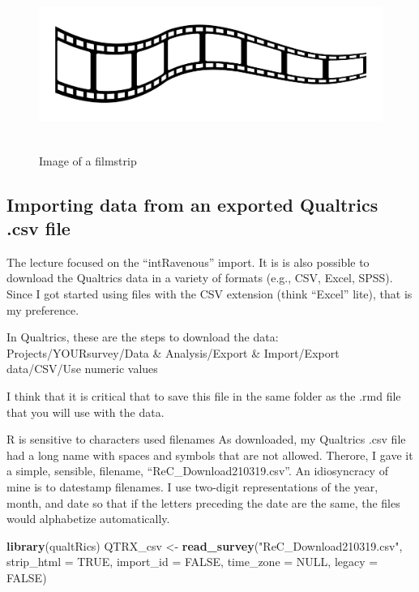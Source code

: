 \documentclass[
  11pt,
]{book}
\newenvironment{Shaded}{\begin{snugshade}}{\end{snugshade}}
\newcommand{\AttributeTok}[1]{\textcolor[rgb]{0.27,0.27,0.27}{#1}}
\newcommand{\ConstantTok}[1]{\textcolor[rgb]{0.37,0.37,0.37}{#1}}
\newcommand{\FunctionTok}[1]{\textcolor[rgb]{0.27,0.27,0.27}{\textbf{#1}}}
\newcommand{\NormalTok}[1]{#1}
\newcommand{\OtherTok}[1]{\textcolor[rgb]{0.37,0.37,0.37}{#1}}
\newcommand{\StringTok}[1]{\textcolor[rgb]{0.5,0.5,0.5}{#1}}
\begin{document}
\begin{figure}
\hypertarget{id}{%
\centering
\includegraphics[width=6.45833in,height=2.19792in]{images/film-strip-1.jpg}
\caption{Image of a filmstrip}\label{id}
}
\end{figure}

\hypertarget{importing-data-from-an-exported-qualtrics-.csv-file}{%
\subsection{Importing data from an exported Qualtrics .csv file}\label{importing-data-from-an-exported-qualtrics-.csv-file}}

The lecture focused on the ``intRavenous'' import. It is is also possible to download the Qualtrics data in a variety of formats (e.g., CSV, Excel, SPSS). Since I got started using files with the CSV extension (think ``Excel'' lite), that is my preference.

In Qualtrics, these are the steps to download the data: Projects/YOURsurvey/Data \& Analysis/Export \& Import/Export data/CSV/Use numeric values

I think that it is critical that to save this file in the same folder as the .rmd file that you will use with the data.

R is sensitive to characters used filenames As downloaded, my Qualtrics .csv file had a long name with spaces and symbols that are not allowed. Therore, I gave it a simple, sensible, filename, ``ReC\_Download210319.csv''. An idiosyncracy of mine is to datestamp filenames. I use two-digit representations of the year, month, and date so that if the letters preceding the date are the same, the files would alphabetize automatically.

\begin{Shaded}
\begin{Highlighting}[]
\FunctionTok{library}\NormalTok{(qualtRics)}
\NormalTok{QTRX\_csv }\OtherTok{\textless{}{-}} \FunctionTok{read\_survey}\NormalTok{(}\StringTok{"ReC\_Download210319.csv"}\NormalTok{, }\AttributeTok{strip\_html =} \ConstantTok{TRUE}\NormalTok{, }\AttributeTok{import\_id =} \ConstantTok{FALSE}\NormalTok{,}
    \AttributeTok{time\_zone =} \ConstantTok{NULL}\NormalTok{, }\AttributeTok{legacy =} \ConstantTok{FALSE}\NormalTok{)}
\end{Highlighting}
\end{Shaded}
\end{document}

